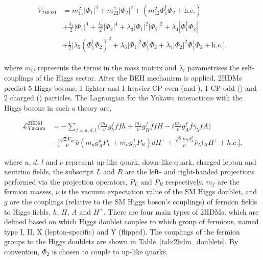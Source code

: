 \begin{align}
\label{eqn:lag_2hdm}
\begin{split}
V_{\text{2HDM}} &= m_{11}^{2}|\Phi_{1}|^2 + m_{22}^{2}|\Phi_{2}|^2 + (m_{12}^{2}\Phi_{1}^{\dagger}\Phi_{2} + \text{h.c.}) \\
&+ \frac{\lambda_1}{2}|\Phi_{1}|^4 + \frac{\lambda_2}{2}|\Phi_{2}|^4 + \lambda_3 |\Phi_{1}|^2 |\Phi_{2}|^2 + \lambda_4  |\Phi_{1}^{\dagger} \Phi_{2}| \\
&+ \frac{1}{2}\Big[ \lambda_5 (\Phi_{1}^{\dagger} \Phi_{2})^{2} + \lambda_6 |\Phi_{1}|^{2} \Phi_{1}^{\dagger} \Phi_{2} +  \lambda_7 |\Phi_{2}|^{2} \Phi_{1}^{\dagger} \Phi_{2} + \text{h.c.} \Big],
\end{split}
\end{align}

where $m_{ij}$ represents the terms in the mass matrix and $\lambda_i$ parametrises the self-couplings of the Higgs sector. 
After the \ac{BEH} mechanism is applied, \ac{2HDM}s predict 5 Higgs bosons; 1 lighter and 1 heavier \ac{CP}-even (\Ph and \PH), 1 \ac{CP}-odd (\PA) and 2 charged (\PHc) particles.
The Lagrangian for the Yukawa interactions with the Higgs bosons in such a theory are,

\begin{equation}
\begin{aligned}
\mathcal{L}^{\text{2HDM}}_{\text{Yukawa}} &= - \sum_{f=u,d,l}\Big(\frac{m_{f}}{\nu}g^{f}_{h}\bar{f}fh + \frac{m_{f}}{\nu}g^{f}_{H}\bar{f}fH -i\frac{m_{f}}{\nu}g^{f}_{A}\bar{f}\gamma_{5}fA\Big)  \\ 
&- \Big[\frac{\sqrt{2}V_{ud}}{\nu}\bar{u}(m_{u}g^{u}_{A}P_{L} + m_{d}g^{d}_{A}P_{R})dH^{+} + \frac{\sqrt{2}m_{l}g^{d}_{A}}{\nu}\bar{\nu}_{L}l_{R}H^{+} + h.c.\Big],
\end{aligned}
\end{equation}

where $u$, $d$, $l$ and $\nu$ represent up-like quark, down-like quark, charged lepton and neutrino fields, the subscript $L$ and $R$ are the left- and right-handed projections performed via the projection operators, $P_L$ and $P_R$ respectively.
$m_{f}$ are the fermion masses, $\nu$ is the vacuum expectation value of the \ac{SM} Higgs doublet, and $g$ are the couplings (relative to the \ac{SM} Higgs boson's couplings) of fermion fields to Higgs fields, $h$, $H$, $A$ and $H^{+}$.
There are four main types of \ac{2HDM}s, which are defined based on which Higgs doublet couples to which group of fermions, named type I, II, X (lepton-specific) and Y (flipped).
The couplings of the fermion groups to the Higgs doublets are shown in Table~\ref{tab:2hdm_doublets}. 
By convention, $\Phi_2$ is chosen to couple to up-like quarks.

